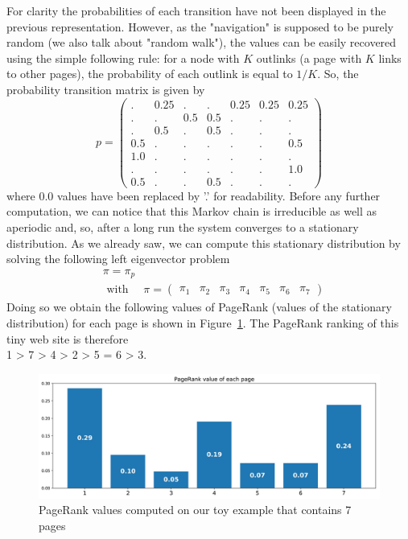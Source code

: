 For clarity the probabilities of each transition have not been displayed in the previous representation. However, as the "navigation" is supposed to be purely random (we also talk about "random walk"), the values can be easily recovered using the simple following rule: for a node with $K$ outlinks (a page with $K$ links to other pages), the probability of each outlink is equal to $1/K$. So, the probability transition matrix is given by
\begin{equation}p=\left(\begin{array}{ccccccc}
. & 0.25 & . & . & 0.25 & 0.25 & 0.25 \\
. & . & 0.5 & 0.5 & . & . & . \\
. & 0.5 & . & 0.5 & . & . & . \\
0.5 & . & . & . & . & . & 0.5 \\
1.0 & . & . & . & . & . & . \\
. & . & . & . & . & . & 1.0 \\
0.5 & . & . & 0.5 & . & . & .
\end{array}\right)\end{equation}
where 0.0 values have been replaced by '.' for readability. Before any further computation, we can notice that this Markov chain is irreducible as well as aperiodic and, so, after a long run the system converges to a stationary distribution. As we already saw, we can compute this stationary distribution by solving the following left eigenvector problem
\begin{equation}\begin{aligned}
&\pi=\pi_p\\
&\text { with } \quad \pi=\left(\begin{array}{lllllll}
\pi_{1} & \pi_{2} & \pi_{3} & \pi_{4} & \pi_{5} & \pi_{6} & \pi_{7}
\end{array}\right)
\end{aligned}\end{equation}
Doing so we obtain the following values of PageRank (values of the stationary distribution) for each page is shown in Figure~\ref{fig:p05c07-snip11}.
The PageRank ranking of this tiny web site is therefore\\
1 > 7 > 4 > 2 > 5 = 6 > 3.

\begin{figure}[h]
    \centering
\includegraphics[width=\textwidth]{pic/p05c07-snip11.png}
    \caption{PageRank values computed on our toy example that contains 7 pages}
    \label{fig:p05c07-snip11}
\end{figure}





